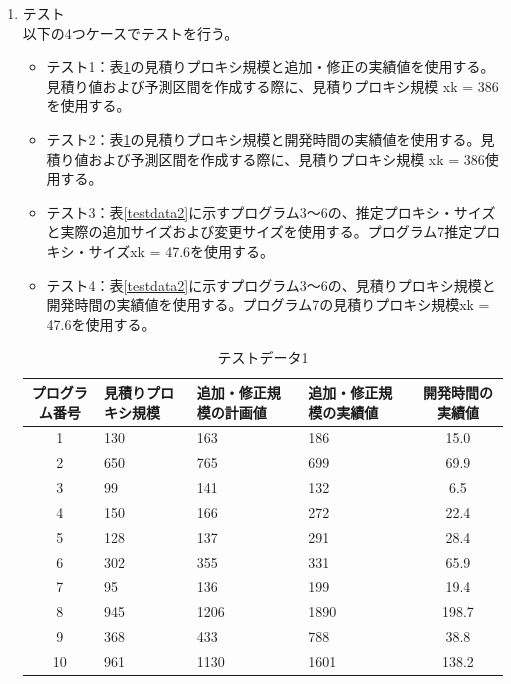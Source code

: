 \documentclass[titlepage,a4paper,12pt]{ltjsreport}
\begin{document}
\begin{enumerate}
\begin{itemize}
    \end{itemize}


    \item テスト\mbox{}\\
    以下の4つケースでテストを行う。
    \begin{itemize}
        \item テスト1：表\ref{testdata1}の見積りプロキシ規模と追加・修正の実績値を使用する。見積り値および予測区間を作成する際に、見積りプロキシ規模 xk = 386 を使用する。
        \item テスト2：表\ref{testdata1}の見積りプロキシ規模と開発時間の実績値を使用する。見積り値および予測区間を作成する際に、見積りプロキシ規模 xk = 386使用する。
        \item テスト3：表\ref{testdata2}に示すプログラム3～6の、推定プロキシ・サイズと実際の追加サイズおよび変更サイズを使用する。プログラム7推定プロキシ・サイズxk = 47.6を使用する。
        \item テスト4：表\ref{testdata2}に示すプログラム3～6の、見積りプロキシ規模と開発時間の実績値を使用する。プログラム7の見積りプロキシ規模xk = 47.6を使用する。
    \end{itemize}

    \begin{table}[H]
        \centering
        \caption{テストデータ1}
        \label{testdata1}
        \begin{tabularx}{\textwidth}{|c|X|X|X|c|}
            \hline
            プログラム番号 & 見積りプロキシ規模 & 追加・修正規模の計画値 & 追加・修正規模の実績値 & 開発時間の実績値 \\
            \hline
            1 & 130 & 163 & 186 & 15.0 \\
            2 & 650 & 765 & 699 & 69.9 \\
            3 & 99 & 141 & 132 & 6.5 \\
            4 & 150 & 166 & 272 & 22.4 \\
            5 & 128 & 137 & 291 & 28.4 \\
            6 & 302 & 355 & 331 & 65.9 \\
            7 & 95 & 136 & 199 & 19.4 \\
            8 & 945 & 1206 & 1890 & 198.7 \\
            9 & 368 & 433 & 788 & 38.8 \\
            10 & 961 & 1130 & 1601 & 138.2 \\
            \hline
        \end{tabularx}
    \end{table}
    

\end{enumerate}
\end{document}
